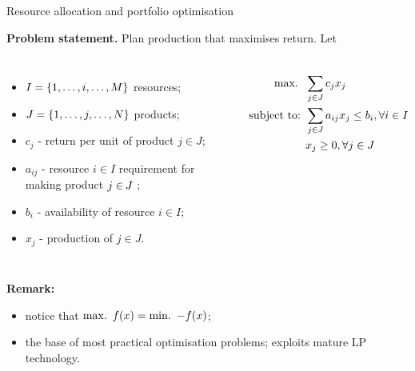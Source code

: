 \begin{frame}{Resource allocation and portfolio optimisation}

	{\bf Problem statement.} Plan production that maximises return. Let
	\begin{columns}
		\begin{itemize}
			\item {\small $I = \left\{ 1, \dots, i, \dots, M \right \}$} resources; 
			\item {\small $J = \left\{ 1, \dots, j, \dots, N \right \}$} products;
			\item $c_j$ - return per unit of product $j\in J$;
			\item $a_{ij}$ - resource $i\in I$ requirement for making product $j\in\hspace{-1pt} J$ ;
			\item $b_i$ - availability of resource $i\in I$; 
			\item $x_j$ - production of $j \in J$.
		\end{itemize}
		
		\pause
		\begin{align*}
			\mathop{\text{max.} \ } \ & \sum_{j \in J} c_jx_j \\
			\mbox{subject to: } & \sum_{j \in J}a_{ij}x_j \leq b_i, \forall i \in I\\
			& x_j \geq 0, \forall j \in J
		\end{align*} 
	\end{columns}
	\pause
	\vfill
	{\bf Remark:} 
	\vspace{-6pt}
	\begin{itemize}[<+->]
		\item notice that $\mathop{\text{max.} \ } f(x) = \mathop{\text{min.} \ } - f(x)$;
		\item the base of \alert{most practical optimisation problems}; exploits mature LP technology.
	\end{itemize}

\end{frame}


